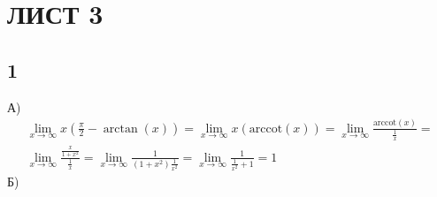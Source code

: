 \newpage
	\section{ЛИСТ 3}
		\subsection{1}
		А)\\
		\begin{gather*}
			\lim\limits_{x \to \infty} x(\frac{\pi}{2} - \arctan(x)) = 
			\lim\limits_{x \to \infty} x(\text{arccot}(x)) = 
			\lim\limits_{x \to \infty} \frac{\text{arccot}(x)}{\frac{1}{x}} = \\
			\lim\limits_{x \to \infty} \frac{\frac{x}{1 + x^2}}{\frac{1}{x}} = 
			\lim\limits_{x \to \infty} \frac{1}{(1 + x^2)\frac{1}{x^2}} = 
			\lim\limits_{x \to \infty} \frac{1}{\frac{1}{x^2} + 1} = 
			1
		\end{gather*}
		Б)\\
		\begin{comment}
		\begin{gather*}
			\lim\limits_{x \to 0} \frac{\cos\sin(x) - \cos(x)}{x^4} = 
			\lim\limits_{x \to 0} \frac{-\sin\sin(x) \cdot \cos(x) + \sin(x)}{4x^3} = 
			\lim\limits_{x \to 0} \frac{-\cos\sin(x) \cdot \cos^2(x) + \sin(x) \cdot \sin\sin(x) + \cos(x)}{12x^2} =\\
			\lim\limits_{x \to 0} \bigg( \frac{\cos(x) - \cos(x)^2 \cdot \cos\sin(x)}{12x^2} + \frac{\sin(x) \cdot \sin\sin(x)}{12x^2} \bigg) =\\
			\lim\limits_{x \to 0} \frac{\cos(x) - \cos^2(x) \cdot \cos\sin(x)}{12x^2} +
			\lim\limits_{x \to 0} \frac{\sin(x) \cdot \sin\sin(x)}{12x^2} = \\
			\lim\limits_{x \to 0} \frac{-\sin(x) + 2\cos(x) \cdot \sin(x) \cdot \cos\sin(x) + \sin\sin(x) \cdot \cos^3(x)}{24x} + 
			\lim\limits_{x \to 0} \frac{\cos(x) \cdot \sin\sin(x) + \sin(x) \cdot \cos\sin(x) \cdot \cos(x)}{24x} =\\
			\lim\limits_{x \to 0} -\frac{\sin(x)}{24x} +
			\lim\limits_{x \to 0} \frac{2\cos(x)}{24} \cdot
			\lim\limits_{x \to 0} \frac{\sin(x)}{x} \cdot
			\lim\limits_{x \to 0} \cos\sin(x) +
			\lim\limits_{x \to 0} \frac{\sin\sin(x) \cdot \cos^3(x)}{24x} +\\
			\lim\limits_{x \to 0} \frac{-\sin(x) \cdot \sin\sin(x) + \cos^2(x) \cdot \cos\sin(x) + \cos(x) \cdot \cos\sin(x) \cdot \cos(x)}{24} =\\
			-\frac{1}{24} + \frac{1}{12} + 
			\lim\limits_{x \to 0} \frac{\cos\sin(x) \cdot \cos^4(x) + \sin\sin(x) \cdot 3\sin^2(x)}{24} +\\
			\lim\limits_{x \to 0} \bigg( \frac{-\sin(x) \cdot \sin\sin(x) + \cos^2(x) \cdot \cos\sin(x)}{24} + \\ \frac{\cos(x) \cdot \cos\sin(x) \cdot \cos(x) - \sin(x) \cdot \sin\sin(x) \cdot \cos^2(x) - \cos\sin(x) \cdot \sin(x)}{24} \bigg)=\\
			-\frac{1}{24} + \frac{1}{12} + \frac{1}{24} + \frac{1+1}{24} = \frac{1}{12} + \frac{1}{12} = \frac{1}{6}
		\end{gather*}
		\end{comment}
